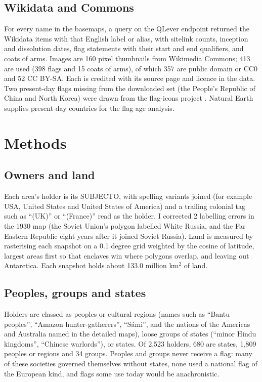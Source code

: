\documentclass[11pt,a4paper]{article}
\begin{document}
\subsection{Wikidata and Commons}
For every name in the basemaps, a query on the QLever endpoint \citep{qlever} returned the Wikidata items with that English label or alias, with sitelink counts, inception and dissolution dates, flag statements with their start and end qualifiers, and coats of arms. Images are 160 pixel thumbnails from Wikimedia Commons; 413 are used (398 flags and 15 coats of arms), of which 357 are public domain or CC0 and 52 CC BY-SA. Each is credited with its source page and licence in the data. Two present-day flags missing from the downloaded set (the People's Republic of China and North Korea) were drawn from the flag-icons project \citep{flagicons}. Natural Earth \citep{naturalearth} supplies present-day countries for the flag-age analysis.

\section{Methods}
\subsection{Owners and land}
Each area's holder is its SUBJECTO, with spelling variants joined (for example USA, United States and United States of America) and a trailing colonial tag such as ``(UK)'' or ``(France)'' read as the holder. I corrected 2 labelling errors in the 1930 map (the Soviet Union's polygon labelled White Russia, and the Far Eastern Republic eight years after it joined Soviet Russia). Land is measured by rasterising each snapshot on a 0.1 degree grid weighted by the cosine of latitude, largest areas first so that enclaves win where polygons overlap, and leaving out Antarctica. Each snapshot holds about 133.0 million km$^2$ of land.

\subsection{Peoples, groups and states}
Holders are classed as peoples or cultural regions (names such as ``Bantu peoples'', ``Amazon hunter-gatherers'', ``Sámi'', and the nations of the Americas and Australia named in the detailed maps), loose groups of states (``minor Hindu kingdoms'', ``Chinese warlords''), or states. Of 2,523 holders, 680 are states, 1,809 peoples or regions and 34 groups. Peoples and groups never receive a flag: many of these societies governed themselves without states, none used a national flag of the European kind, and flags some use today would be anachronistic.
\end{document}
